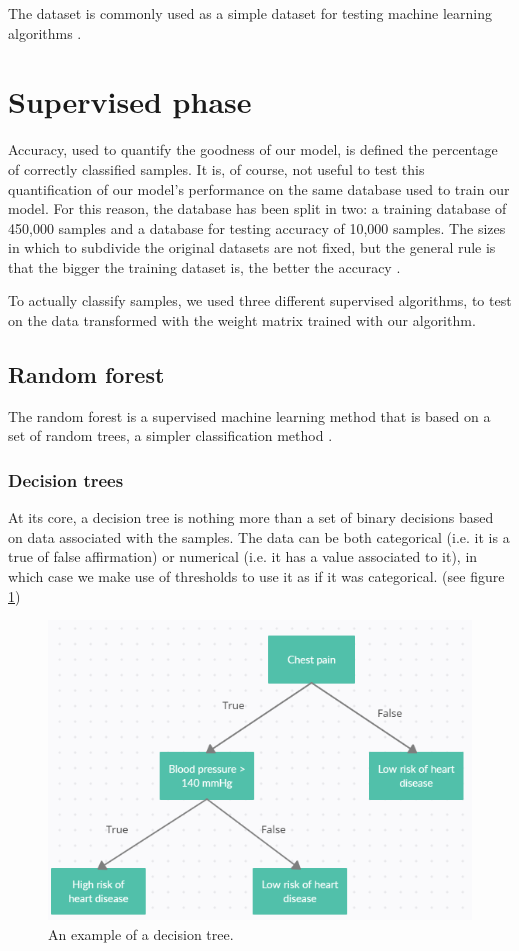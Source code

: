\documentclass[a4paper]{report}
\begin{document}
The dataset is commonly used as a simple dataset for testing machine learning algorithms \cite{cohen2017emnist}.


\section{Supervised phase}
Accuracy, used to quantify the goodness of our model, is defined the percentage of correctly classified samples.
It is, of course, not useful to test this quantification of our model's performance on the same database used to train our model.
For this reason, the database has been split in two:
a training database of 450,000 samples and a database for testing accuracy of 10,000 samples.
The sizes in which to subdivide the original datasets are not fixed, but the general rule is that the bigger the training dataset is, the better the accuracy \cite{bishop2006pattern}.

To actually classify samples, we used three different supervised algorithms, to test on the data transformed with the weight matrix trained with our algorithm.

\subsection{Random forest}
The random forest is a supervised machine learning method that is based on a set of random trees, a simpler classification method \cite{breiman2001random}.

\subsubsection{Decision trees}
At its core, a decision tree is nothing more than a set of binary decisions based on data associated with the samples.
The data can be both categorical (i.e.  it is a true of false affirmation) or numerical (i.e.  it has a value associated to it), in which case we make use of thresholds to use it as if it was categorical.
(see figure \ref{chestt})

\begin{figure} [H]
	\centering
	\includegraphics [width=12cm] {o/chestt.png}
	\caption{An example of a decision tree.}
	\label{chestt}
\end{figure}
\end{document}

